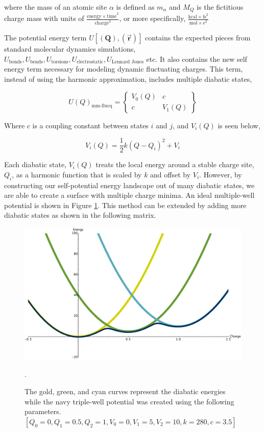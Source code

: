 where the mass of an atomic site $\alpha$ is defined as $m_\alpha$ and $M_Q$ is
the fictitious charge mass with units of $\frac{\mathrm{energy\times
time}^2}{\mathrm{charge}^2}$, or more specifically, $\frac{\mathrm{kcal\times
fs}^2}{\mathrm{mol\times e}^2}$


The potential energy term $U[(\mathbf{Q}),(\vec{\mathbf{r}})]$ contains the expected
pieces from standard molecular dynamics simulations, $U_{\text{bonds}},
U_{\text{bends}}, U_{\text{torsions}}, U_{\text{electrostatic}},
U_{\text{Lennard Jones}}$ etc. It also contains the new self energy term necessary
for modeling dynamic fluctuating charges. This term, instead of using the harmonic
approximation, includes multiple diabatic states,

\begin{equation}
U(Q)_{\text{mm-flucq}} =
\begin{Bmatrix}
 V_0(Q) & c  \\
 c   & V_1(Q)
\end{Bmatrix}
\end{equation}

Where $c$ is a coupling constant between states $i$ and $j$, and $V_i(Q)$ is seen below,

\begin{equation*}
V_i(Q) = \frac{1}{2}k(Q - Q_i)^2 + V_i
\end{equation*}

Each diabatic state, $V_i(Q)$ treats the local energy around a stable charge
site, $Q_i$, as a harmonic function that is scaled by $k$ and offset by $V_i$.
However, by constructing our self-potential energy landscape out of many
diabatic states, we are able to create a surface with multiple charge minima.
An ideal multiple-well potential is shown in Figure \ref{fig:multipleDiabat}.
This method can be extended by adding more diabatic states as shown in the
following matrix.

\begin{figure}
  \centering
  \includegraphics[width=0.75\linewidth]{../figures/chap5/multipleDiabats.pdf}
  \caption{The gold, green, and cyan curves represent the diabatic energies
while the navy triple-well potential was created using the following parameters.
$[Q_0 = 0, Q_1 = 0.5, Q_2 = 1, V_0 = 0, V_1 = 5, V_2 = 10, k = 280, c = 3.5]$}.
\label{fig:multipleDiabat}
\end{figure}

